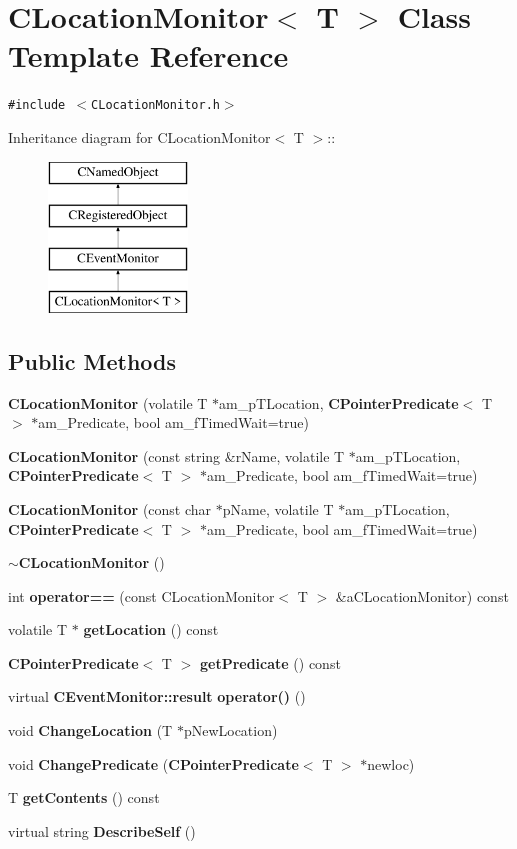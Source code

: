 \section{CLocation\-Monitor$<$ T $>$  Class Template Reference}
\label{classCLocationMonitor}
{\tt \#include $<$CLocation\-Monitor.h$>$}

Inheritance diagram for CLocation\-Monitor$<$ T $>$::\begin{figure}[H]
\begin{center}
\leavevmode
\includegraphics[height=4cm]{classCLocationMonitor}
\end{center}
\end{figure}
\subsection*{Public Methods}
\begin{CompactItemize}
\item 
{\bf CLocation\-Monitor} (volatile T $\ast$am\_\-p\-TLocation, {\bf CPointer\-Predicate}$<$ T $>$ $\ast$am\_\-Predicate, bool am\_\-f\-Timed\-Wait=true)
\item 
{\bf CLocation\-Monitor} (const string \&r\-Name, volatile T $\ast$am\_\-p\-TLocation, {\bf CPointer\-Predicate}$<$ T $>$ $\ast$am\_\-Predicate, bool am\_\-f\-Timed\-Wait=true)
\item 
{\bf CLocation\-Monitor} (const char $\ast$p\-Name, volatile T $\ast$am\_\-p\-TLocation, {\bf CPointer\-Predicate}$<$ T $>$ $\ast$am\_\-Predicate, bool am\_\-f\-Timed\-Wait=true)
\item 
{\bf $\sim$CLocation\-Monitor} ()
\item 
int {\bf operator==} (const CLocation\-Monitor$<$ T $>$ \&a\-CLocation\-Monitor) const
\item 
volatile T $\ast$ {\bf get\-Location} () const
\item 
{\bf CPointer\-Predicate}$<$ T $>$ {\bf get\-Predicate} () const
\item 
virtual {\bf CEvent\-Monitor::result} {\bf operator()} ()
\item 
void {\bf Change\-Location} (T $\ast$p\-New\-Location)
\item 
void {\bf Change\-Predicate} ({\bf CPointer\-Predicate}$<$ T $>$ $\ast$newloc)
\item 
T {\bf get\-Contents} () const
\item 
virtual string {\bf Describe\-Self} ()
\end{CompactItemize}
